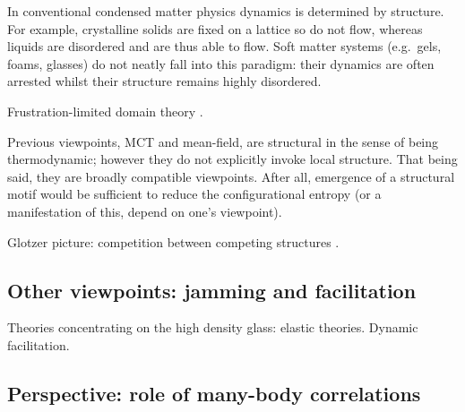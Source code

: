 In conventional condensed matter physics dynamics is determined by structure.
For example, crystalline solids are fixed on a lattice so do not flow, whereas liquids are disordered and are thus able to flow.
Soft matter systems (e.g.\ gels, foams, glasses) do not neatly fall into this paradigm: their dynamics are often arrested whilst their structure remains highly disordered.

Frustration-limited domain theory \cite{TarjusJPCM2005}.

Previous viewpoints, MCT and mean-field, are structural in the sense of being thermodynamic; however they do not explicitly invoke local structure.
That being said, they are broadly compatible viewpoints.
After all, emergence of a structural motif would be sufficient to reduce the configurational entropy (or a manifestation of this, depend on one's viewpoint).

Glotzer picture: competition between competing structures \cite{TeichNC2019}.

\subsection{Other viewpoints: jamming and facilitation}

Theories concentrating on the high density glass: elastic theories.
Dynamic facilitation.

\subsection{Perspective: role of many-body correlations}


